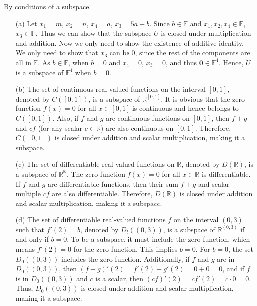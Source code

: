 \begin{solution}
    By conditions of a subspace.
    \begin{enumerate}
        \item[(a)] Let \( x_1 = m \), \( x_2 = n \), \( x_4 = a \), \( x_3 = 5a + b \). Since \( b \in \mathbb{F} \) and \( x_1, x_2, x_4 \in \mathbb{F} \), \( x_3 \in \mathbb{F} \). Thus we can show that the subspace \( U \) is closed under multiplication and addition. Now we only need to show the existence of additive identity. We only need to show that \( x_3 \) can be 0, since the rest of the components are all in \( \mathbb{F} \). As \( b \in \mathbb{F} \), when \( b = 0 \) and \( x_4 = 0 \), \( x_3 = 0 \), and thus \( \mathbf{0} \in \mathbb{F}^4 \). Hence, \( U \) is a subspace of \( \mathbb{F}^4 \) when \( b = 0 \).
        
        \item[(b)] The set of continuous real-valued functions on the interval \([0,1]\), denoted by \( C([0,1]) \), is a subspace of \( \mathbb{R}^{[0,1]} \). It is obvious that the zero function \( f(x) = 0 \) for all \( x \in [0,1] \) is continuous and hence belongs to \( C([0,1]) \). Also, if \( f \) and \( g \) are continuous functions on \([0,1]\), then \( f + g \) and \( cf \) (for any scalar \( c \in \mathbb{R} \)) are also continuous on \([0,1]\). Therefore, \( C([0,1]) \) is closed under addition and scalar multiplication, making it a subspace.
        
        \item[(c)] The set of differentiable real-valued functions on \( \mathbb{R} \), denoted by \( D(\mathbb{R}) \), is a subspace of \( \mathbb{R}^{\mathbb{R}} \). The zero function \( f(x) = 0 \) for all \( x \in \mathbb{R} \) is differentiable. If \( f \) and \( g \) are differentiable functions, then their sum \( f + g \) and scalar multiple \( cf \) are also differentiable. Therefore, \( D(\mathbb{R}) \) is closed under addition and scalar multiplication, making it a subspace.
        
        \item[(d)] The set of differentiable real-valued functions \( f \) on the interval \( (0,3) \) such that \( f'(2) = b \), denoted by \( D_b((0,3)) \), is a subspace of \( \mathbb{R}^{(0,3)} \) if and only if \( b = 0 \). To be a subspace, it must include the zero function, which means \( f'(2) = 0 \) for the zero function. This implies \( b = 0 \). For \( b = 0 \), the set \( D_0((0,3)) \) includes the zero function. Additionally, if \( f \) and \( g \) are in \( D_0((0,3)) \), then \( (f + g)'(2) = f'(2) + g'(2) = 0 + 0 = 0 \), and if \( f \) is in \( D_0((0,3)) \) and \( c \) is a scalar, then \( (cf)'(2) = cf'(2) = c \cdot 0 = 0 \). Thus, \( D_0((0,3)) \) is closed under addition and scalar multiplication, making it a subspace.
        

\end{enumerate}
\end{solution}
